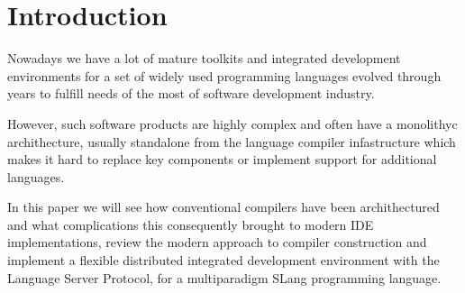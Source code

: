 \chapter{Introduction}
\label{chap:intro}

Nowadays we have a lot of mature toolkits and integrated development environments for a set of widely used programming languages
evolved through years to fulfill needs of the most of software development industry.

However, such software products are highly complex and often have a monolithyc archithecture, usually standalone 
from the language compiler infastructure which makes it hard to replace key components or implement support for additional languages.

In this paper we will see how conventional compilers have been archithectured and what complications 
this consequently brought to modern IDE implementations, review the modern approach to compiler construction and implement a flexible 
distributed integrated development environment with the \\Language Server Protocol, for a multiparadigm SLang\cite{Zouev2017} programming language. 